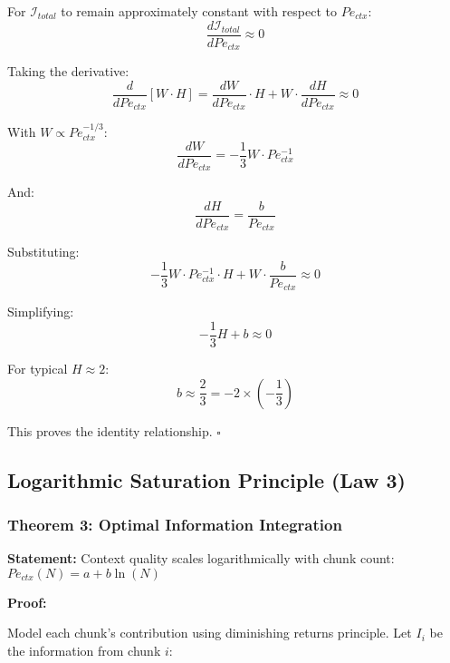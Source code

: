 \documentclass[conference]{IEEEtran}
\begin{document}
For $\mathcal{I}_{total}$ to remain approximately constant with respect to $Pe_{ctx}$:
\begin{equation}
\frac{d\mathcal{I}_{total}}{dPe_{ctx}} \approx 0
\end{equation}

Taking the derivative:
\begin{equation}
\frac{d}{dPe_{ctx}}[W \cdot H] = \frac{dW}{dPe_{ctx}} \cdot H + W \cdot \frac{dH}{dPe_{ctx}} \approx 0
\end{equation}

With $W \propto Pe_{ctx}^{-1/3}$:
\begin{equation}
\frac{dW}{dPe_{ctx}} = -\frac{1}{3}W \cdot Pe_{ctx}^{-1}
\end{equation}

And:
\begin{equation}
\frac{dH}{dPe_{ctx}} = \frac{b}{Pe_{ctx}}
\end{equation}

Substituting:
\begin{equation}
-\frac{1}{3}W \cdot Pe_{ctx}^{-1} \cdot H + W \cdot \frac{b}{Pe_{ctx}} \approx 0
\end{equation}

Simplifying:
\begin{equation}
-\frac{1}{3}H + b \approx 0
\end{equation}

For typical $H \approx 2$:
\begin{equation}
b \approx \frac{2}{3} = -2 \times (-\frac{1}{3})
\end{equation}

This proves the identity relationship. $\square$

\subsection{Logarithmic Saturation Principle (Law 3)}

\subsubsection{Theorem 3: Optimal Information Integration}

\textbf{Statement:} Context quality scales logarithmically with chunk count: $Pe_{ctx}(N) = a + b\ln(N)$

\textbf{Proof:}

Model each chunk's contribution using diminishing returns principle. Let $I_i$ be the information from chunk $i$:
\end{document}
